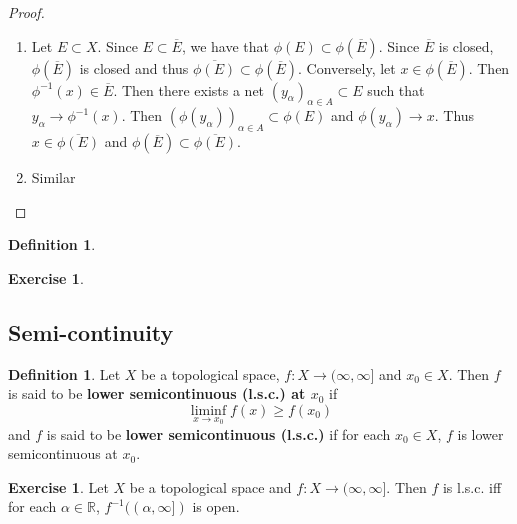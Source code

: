 \documentclass[12pt]{amsart}
\theoremstyle{definition}
\newtheorem{defn}[definition]{Definition}
\newtheorem{ex}[definition]{Exercise}
\newcommand{\al}{\alpha}
\newcommand{\R}{\mathbb{R}}
\newcommand{\Ru}{(\infty, \infty]}
\newcommand{\lsc}{l.s.c. }
\newcommand{\lex}[1]{\label{ex:#1}}
\newcommand{\ld}[1]{\label{defn:#1}}
\begin{document}
	\begin{proof}\
		\begin{enumerate}
			\item Let $E \subset X$. Since $E \subset \overline{E}$, we have that $\phi(E) \subset \phi(\overline{E})$. Since $\overline{E}$ is closed, $\phi(\overline{E})$ is closed and thus $\overline{\phi(E)} \subset \phi(\overline{E})$. Conversely, let $x \in \phi(\overline{E})$. Then $\phi^{-1}(x) \in \overline{E}$. Then there exists a net $( y_{\al} )_{\al \in A} \subset E$ such that $y_{\al} \rightarrow \phi^{-1}(x)$. Then $( \phi(y_{\al}) )_{\al \in A } \subset \phi(E)$ and $\phi(y_{\al}) \rightarrow x$. Thus $x \in \overline{\phi(E)}$ and $\phi(\overline{E}) \subset \overline{\phi(E)}$.
			\item Similar
		\end{enumerate} 
	\end{proof}
	
	\begin{defn} \ld{}
	
	\end{defn}
	
	\begin{ex} \lex{}
	
	\end{ex}
	
	
	
	
	
	
	
	
	
	
	
	
	
	
	\newpage
	\subsection{Semi-continuity}
	
	\begin{defn} \ld{}
	Let $X$ be a topological space, $f: X \rightarrow \Ru$ and $x_0 \in X$. Then $f$ is said to be \textbf{lower semicontinuous (l.s.c.) at $x_0$} if $$\liminf_{x \rightarrow x_0}f(x) \geq f(x_0)$$ and $f$ is said to be \textbf{lower semicontinuous (l.s.c.)} if for each $x_0 \in X$, $f$ is lower semicontinuous at $x_0$. 
	\end{defn}
	
	\begin{ex} \lex{}
	Let $X$ be a topological space and $f: X \rightarrow \Ru$. Then $f$ is \lsc iff for each $\al \in \R$, $f^{-1}((\al, \infty])$ is open. 
	\end{ex}
	
\end{document}
